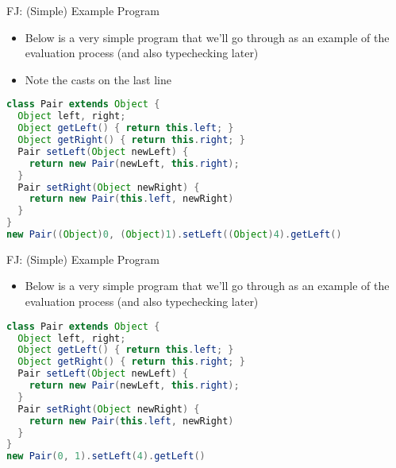 \documentclass[leqno,presentation,usenames,dvipsnames]{beamer}
\begin{document}
\begin{frame}[fragile]{FJ: (Simple) Example Program}
    \begin{itemize}
        \item Below is a very simple program that we'll go through as an example of the evaluation process (and also typechecking later)
        \item Note the casts on the last line
    \end{itemize}

\begin{lstlisting}[language=java, basicstyle=\small\ttfamily]
class Pair extends Object {
  Object left, right;
  Object getLeft() { return this.left; }
  Object getRight() { return this.right; }
  Pair setLeft(Object newLeft) {
    return new Pair(newLeft, this.right);
  }
  Pair setRight(Object newRight) {
    return new Pair(this.left, newRight)
  }
}
new Pair((Object)0, (Object)1).setLeft((Object)4).getLeft()
\end{lstlisting}
\end{frame}

\begin{frame}[fragile]{FJ: (Simple) Example Program}
    \begin{itemize}
        \item Below is a very simple program that we'll go through as an example of the evaluation process (and also typechecking later)
    \end{itemize}

\begin{lstlisting}[language=java, basicstyle=\small\ttfamily]
class Pair extends Object {
  Object left, right;
  Object getLeft() { return this.left; }
  Object getRight() { return this.right; }
  Pair setLeft(Object newLeft) {
    return new Pair(newLeft, this.right);
  }
  Pair setRight(Object newRight) {
    return new Pair(this.left, newRight)
  }
}
new Pair(0, 1).setLeft(4).getLeft()
\end{lstlisting}
\end{frame}
\end{document}
